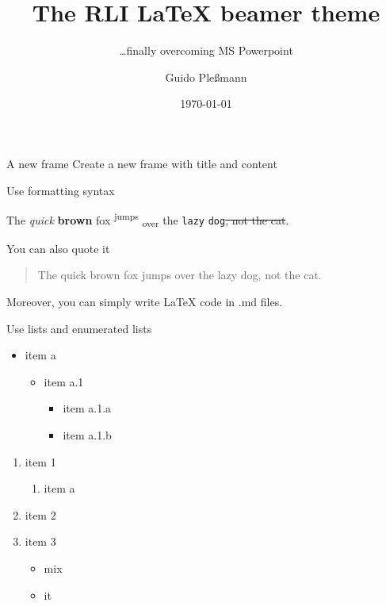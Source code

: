 \documentclass[ignorenonframetext,aspectratio=169]{beamer}
\title{The RLI \LaTeX{} beamer theme}
\subtitle{\ldots finally overcoming MS Powerpoint}
\author{Guido Pleßmann}
\date{\today}
\institute{Reiner Lemoine Institut}
\begin{document}
\frame{\titlepage}

\begin{frame}[fragile]{A new frame}
Create a new frame with title and content

\end{frame}

\begin{frame}[fragile]{Use formatting syntax}

The \emph{quick} \textbf{brown} fox \textsuperscript{jumps}
\textsubscript{over} the \texttt{lazy} \texttt{dog}\sout{, not the cat}.

You can also quote it

\begin{quote}
The quick brown fox jumps over the lazy dog, not the cat.
\end{quote}

Moreover, you can simply write \LaTeX{} code in .md files.

\end{frame}

\begin{frame}{Use lists and enumerated lists}

\begin{itemize}
\item item a

  \begin{itemize}
  \item item a.1

    \begin{itemize}
    \item item a.1.a
    \item item a.1.b
    \end{itemize}
  \end{itemize}
\end{itemize}

\begin{enumerate}
\item item 1

  \begin{enumerate}
  \item item a
  \end{enumerate}
\item item 2
\item item 3

  \begin{itemize}
  \item mix
  \item it
  \end{itemize}
\end{enumerate}

\end{frame}
\end{document}
